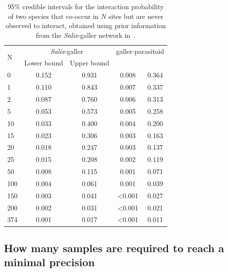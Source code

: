 \documentclass[12pt]{article}
\begin{document}
      \begin{table}[h]
        \caption{95\% credible intervals for the interaction probability of two species that co-occur in $N$ sites but are never observed to interact, obtained using prior information from the \emph{Salix}-galler network in~\citet{Barbour2016,Barbour2016Dryad}.}
        \label{interval_table}
        \begin{tabular}{l | c c | c c }
        \multirow{2}{*}{N} & \multicolumn{2}{c}{\emph{Salix}-galler} & \multicolumn{2}{c}{galler-parasitoid}\\
         & Lower bound & Upper bound \\
        \hline
        0   & 0.152 & 0.931 & 0.008 & 0.364 \\
        1   & 0.110 & 0.843 & 0.007 & 0.337 \\
        2   & 0.087 & 0.760 & 0.006 & 0.313 \\
        5   & 0.053 & 0.573 & 0.005 & 0.258 \\
        10  & 0.033 & 0.400 & 0.004 & 0.200 \\
        15  & 0.023 & 0.306 & 0.003 & 0.163 \\
        20  & 0.018 & 0.247 & 0.003 & 0.137 \\
        25  & 0.015 & 0.208 & 0.002 & 0.119 \\
        50  & 0.008 & 0.115 & 0.001 & 0.071 \\
        100 & 0.004 & 0.061 & 0.001 & 0.039 \\
        150 & 0.003 & 0.041 & \textless0.001 & 0.027 \\
        200 & 0.002 & 0.031 & \textless0.001 & 0.021 \\
        \hline
        374 & 0.001 & 0.017 & \textless0.001 & 0.011 \\
        \hline
        \end{tabular}
        \end{table}


  \subsection*{How many samples are required to reach a minimal precision}
\end{document}
